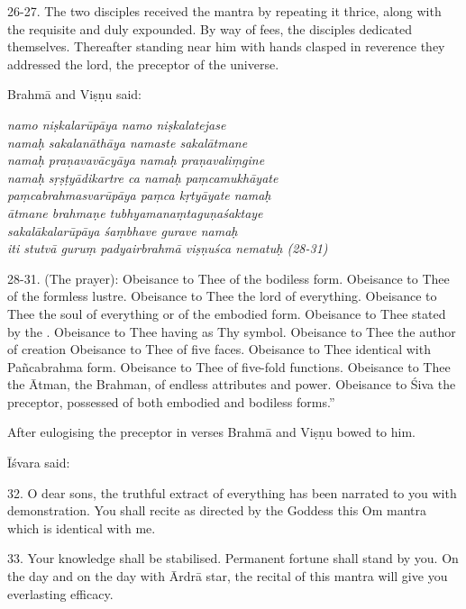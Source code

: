 26-27. The two disciples received the mantra by repeating it thrice, along with
the requisite  and  duly expounded. By way of fees,
the disciples dedicated themselves. Thereafter standing near him with hands
clasped in reverence they addressed the lord, the preceptor of the universe.

Brahmā and Viṣṇu said:

\begin{shloka}\itshape
namo niṣkalarūpāya namo niṣkalatejase\\
namaḥ sakalanāthāya namaste sakalātmane\\

namaḥ praṇavavācyāya namaḥ praṇavaliṃgine\\
namaḥ sṛṣṭyādikartre ca namaḥ paṃcamukhāyate\\

paṃcabrahmasvarūpāya paṃca kṛtyāyate namaḥ\\
ātmane brahmaṇe tubhyamanaṃtaguṇaśaktaye\\

sakalākalarūpāya śaṃbhave gurave namaḥ\\
iti stutvā guruṃ padyairbrahmā viṣṇuśca nematuḥ (28-31)
\end{shloka}

28-31. (The prayer): Obeisance to Thee of the bodiless form. Obeisance to Thee
of the formless lustre. Obeisance to Thee the lord of everything. Obeisance to
Thee the soul of everything or of the embodied form. Obeisance to Thee stated by
the . Obeisance to Thee having  as Thy symbol. Obeisance
to Thee the author of creation \etc Obeisance to Thee of five faces. Obeisance
to Thee identical with Pañcabrahma form. Obeisance to Thee of five-fold
functions. Obeisance to Thee the Ātman, the Brahman, of endless attributes and
power. Obeisance to Śiva the preceptor, possessed of both embodied and bodiless
forms.”

After eulogising the preceptor in verses Brahmā and Viṣṇu bowed to him.

Īśvara said:

32. O dear sons, the truthful extract of everything has been narrated to you
with demonstration. You shall recite as directed by the Goddess this Om mantra
which is identical with me.

33. Your knowledge shall be stabilised. Permanent fortune shall stand by you.
On the  day and on the day with Ārdrā star, the recital of this
mantra will give you everlasting efficacy.

